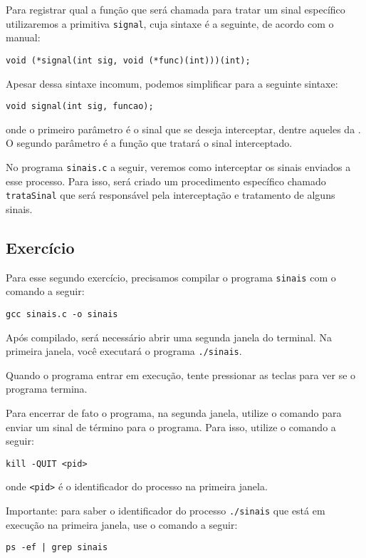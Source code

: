 Para registrar qual a função que será chamada para tratar um sinal específico utilizaremos a primitiva \texttt{signal}, cuja sintaxe é a seguinte, de acordo com o manual:

\begin{lstlisting}[style=MyCStyle, frame=none, numbers=none]
   void (*signal(int sig, void (*func)(int)))(int);
\end{lstlisting}

Apesar dessa sintaxe incomum, podemos simplificar para a seguinte sintaxe:
\begin{lstlisting}[style=MyCStyle, frame=none, numbers=none]
   void signal(int sig, funcao);
\end{lstlisting}
onde o primeiro parâmetro é o sinal que se deseja interceptar, dentre aqueles da . O segundo parâmetro é a função que tratará o sinal interceptado.

No programa \texttt{sinais.c} a seguir, veremos como interceptar os sinais enviados a esse processo. Para isso, será criado um procedimento específico chamado \texttt{trataSinal} que será responsável pela interceptação e tratamento de alguns sinais.

\clearpage %



\subsection{Exercício}
 
 Para esse segundo exercício, precisamos compilar o programa \texttt{sinais} com o comando a seguir:
 
\begin{lstlisting}[style=MyBashStyle]
gcc sinais.c -o sinais 
\end{lstlisting}

Após compilado, será necessário abrir uma segunda janela do terminal. Na primeira janela, você executará o programa \texttt{./sinais}. 

Quando o programa entrar em execução, tente pressionar as teclas  para ver se o programa termina.

Para encerrar de fato o programa, na segunda janela, utilize o comando  para enviar um sinal de término para o programa. Para isso, utilize o comando a seguir:

\begin{lstlisting}[style=MyBashStyle]
kill -QUIT <pid>
\end{lstlisting}

\noindent onde \texttt{<pid>} é o identificador do processo na primeira janela.

Importante: para saber o identificador do processo \texttt{./sinais} que está em execução na primeira janela, use o comando a seguir:

\begin{lstlisting}[style=MyBashStyle]
ps -ef | grep sinais
\end{lstlisting}
